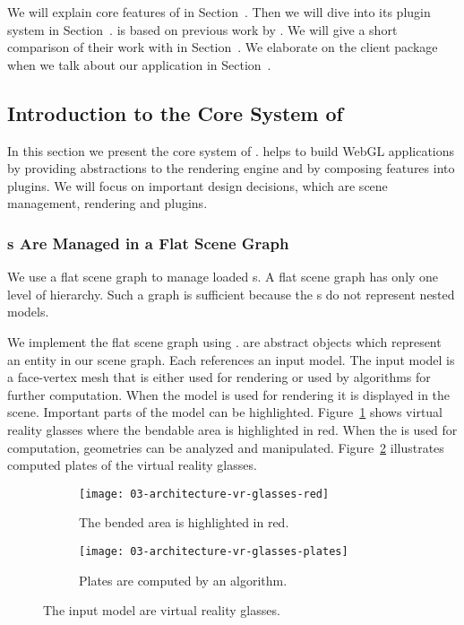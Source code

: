 \documentclass[../../ClassicThesis.tex]{subfiles}
\begin{document}
We will explain core features of {\convertify} in
Section~. Then we will dive into
its plugin system in Section~. {\convertify} is
based on previous work by \citet{bachelor-thesis}. We will give a
short comparison of their work with {\convertify} in
Section~. We elaborate on the client
package when we talk about our application {\platener} in
Section~.

\subsection{Introduction to the Core System of {\convertify}}
\label{sec:convertify-core-features}

In this section we present the core system of {\convertify}.
{\convertify} helps to build WebGL applications by providing
abstractions to the rendering engine and by composing
features into plugins. We will focus on important design
decisions, which are scene management, rendering and
plugins.

\subsubsection{{\threedmodel}s Are Managed in a Flat Scene
  Graph}

We use a flat scene graph to manage loaded {\stlfile}s. A
flat scene graph has only one level of hierarchy. Such a
graph is sufficient because the {\stlfile}s do not represent
nested models.

We implement the flat scene graph using .
 are abstract objects which represent an entity
in our scene graph. Each  references an input
model. The input model is a face-vertex mesh that is either
used for rendering or used by algorithms for further
computation. When the model is used for rendering it is
displayed in the scene. Important parts of the model can be
highlighted. Figure~\ref{fig:vr-glasses:red} shows virtual
reality glasses where the bendable area is highlighted in
red. When the {\threedmodel} is used for computation,
geometries can be analyzed and manipulated.
Figure~\ref{fig:vr-glasses:plates} illustrates computed
plates of the virtual reality glasses.

\begin{figure}[h]
  \centering
  \begin{subfigure}[b]{0.49\textwidth}
    \texttt{[image: 03-architecture-vr-glasses-red]}
    \caption{The bended area is highlighted in red.}
    \label{fig:vr-glasses:red}
  \end{subfigure}
  \begin{subfigure}[b]{0.49\textwidth}
    \texttt{[image: 03-architecture-vr-glasses-plates]}
    \caption{Plates are computed by an algorithm.}
    \label{fig:vr-glasses:plates}
  \end{subfigure}
  \caption{The input model are virtual reality glasses.}
  \label{fig:vr-glasses}
\end{figure}
\end{document}
